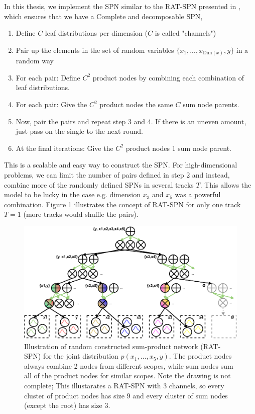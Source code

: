 In this thesis, we implement the SPN similar to the RAT-SPN presented in \cite{RAT_SPN}, 
which ensures that we have a Complete and decomposable SPN,
\begin{enumerate}[noitemsep]
    \item Define $C$ leaf distributions per dimension ($C$ is called "channels")
    \item Pair up the elements in the set of random variables $\{x_1, ..., x_{\text{Dim}(x)}, y\}$ in a random way
    \item For each pair: Define $C^2$ product nodes by combining each combination of leaf distributions. 
    \item For each pair: Give the $C^2$ product nodes the same $C$ sum node parents. 
    \item Now, pair the pairs and repeat step 3 and 4. If there is an uneven amount, just pass on the single to the next round. 
    \item At the final iterations: Give the $C^2$ product nodes 1 sum node parent.
\end{enumerate}
This is a scalable and easy way to construct the SPN. For high-dimensional problems, we can limit the number
of pairs defined in step 2 and instead, combine more of the randomly defined SPNs in several tracks $T$. This allows the
model to be lucky in the case e.g. dimension $x_3$ and $x_5$ was a powerful combination. Figure \ref{SPN_graph_illu}
illustrates the concept of RAT-SPN for only one track $T=1$ (more tracks would shuffle the pairs).

\begin{figure}[H]
    \centering
    \includegraphics[width=\textwidth]{Pictures/SPN_illustration_graph3.pdf}
    \caption{Illustration of random constructed sum-product network (RAT-SPN) for the joint
    distribution $p(x_1, \dots, x_5, y)$. The product nodes always combine 2 nodes from different
    scopes, while sum nodes sum all of the product nodes for similar scopes. Note the drawing is not
    complete; This illustarates a RAT-SPN with 3 channels, so every cluster of product nodes has
    size 9 and every cluster of sum nodes (except the root) has size 3.}
     \label{SPN_graph_illu}
\end{figure}

